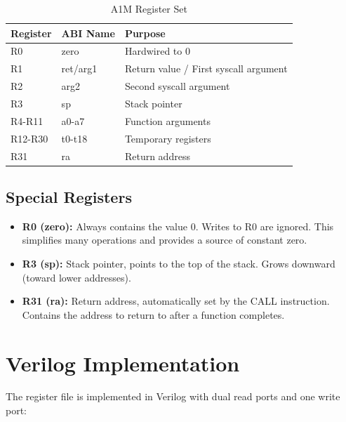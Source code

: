 \documentclass[12pt,a4paper,oneside]{book}
\begin{document}
\begin{table}[H]
\centering
\caption{A1M Register Set}
\label{tab:registers}
\begin{tabularx}{\textwidth}{|l|l|X|}
\hline
\textbf{Register} & \textbf{ABI Name} & \textbf{Purpose} \\
\hline
R0 & zero & Hardwired to 0 \\
R1 & ret/arg1 & Return value / First syscall argument \\
R2 & arg2 & Second syscall argument \\
R3 & sp & Stack pointer \\
R4-R11 & a0-a7 & Function arguments \\
R12-R30 & t0-t18 & Temporary registers \\
R31 & ra & Return address \\
\hline
\end{tabularx}
\end{table}

\subsection{Special Registers}

\begin{itemize}
    \item \textbf{R0 (zero):} Always contains the value 0. Writes to R0 are ignored. This simplifies many operations and provides a source of constant zero.
    \item \textbf{R3 (sp):} Stack pointer, points to the top of the stack. Grows downward (toward lower addresses).
    \item \textbf{R31 (ra):} Return address, automatically set by the CALL instruction. Contains the address to return to after a function completes.
\end{itemize}

\section{Verilog Implementation}

The register file is implemented in Verilog with dual read ports and one write port:
\end{document}
